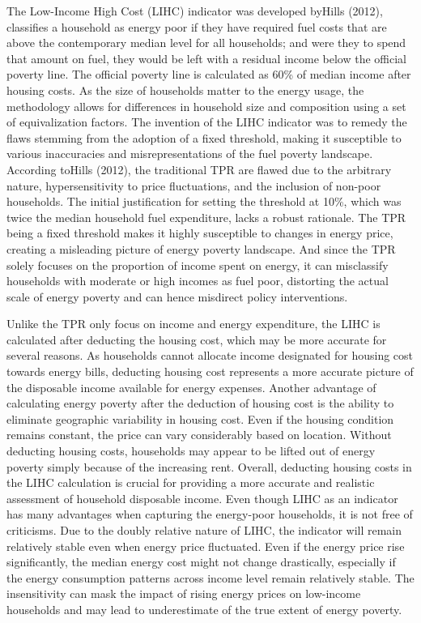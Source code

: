\documentclass[
  twoside,
  openright,
  degree    = master,               %
  language  = english,              %
  fontset   = overleaf,             %
  watermark = true,                 %
  doi       = true,                 %
]{ntuthesis}
\begin{document}
The Low-Income High Cost (LIHC) indicator was developed byHills (2012),
classifies a household as energy poor if they have required fuel costs
that are above the contemporary median level for all households; and
were they to spend that amount on fuel, they would be left with a
residual income below the official poverty line. The official poverty
line is calculated as 60\% of median income after housing costs. As the
size of households matter to the energy usage, the methodology allows
for differences in household size and composition using a set of
equivalization factors. The invention of the LIHC indicator was to
remedy the flaws stemming from the adoption of a fixed threshold, making
it susceptible to various inaccuracies and misrepresentations of the
fuel poverty landscape. According toHills (2012), the traditional TPR
are flawed due to the arbitrary nature, hypersensitivity to price
fluctuations, and the inclusion of non-poor households. The initial
justification for setting the threshold at 10\%, which was twice the
median household fuel expenditure, lacks a robust rationale. The TPR
being a fixed threshold makes it highly susceptible to changes in energy
price, creating a misleading picture of energy poverty landscape. And
since the TPR solely focuses on the proportion of income spent on
energy, it can misclassify households with moderate or high incomes as
fuel poor, distorting the actual scale of energy poverty and can hence
misdirect policy interventions.

Unlike the TPR only focus on income and energy expenditure, the LIHC is
calculated after deducting the housing cost, which may be more accurate
for several reasons. As households cannot allocate income designated for
housing cost towards energy bills, deducting housing cost represents a
more accurate picture of the disposable income available for energy
expenses. Another advantage of calculating energy poverty after the
deduction of housing cost is the ability to eliminate geographic
variability in housing cost. Even if the housing condition remains
constant, the price can vary considerably based on location. Without
deducting housing costs, households may appear to be lifted out of
energy poverty simply because of the increasing rent. Overall, deducting
housing costs in the LIHC calculation is crucial for providing a more
accurate and realistic assessment of household disposable income. Even
though LIHC as an indicator has many advantages when capturing the
energy-poor households, it is not free of criticisms. Due to the doubly
relative nature of LIHC, the indicator will remain relatively stable
even when energy price fluctuated. Even if the energy price rise
significantly, the median energy cost might not change drastically,
especially if the energy consumption patterns across income level remain
relatively stable. The insensitivity can mask the impact of rising
energy prices on low-income households and may lead to underestimate of
the true extent of energy poverty.
\end{document}

